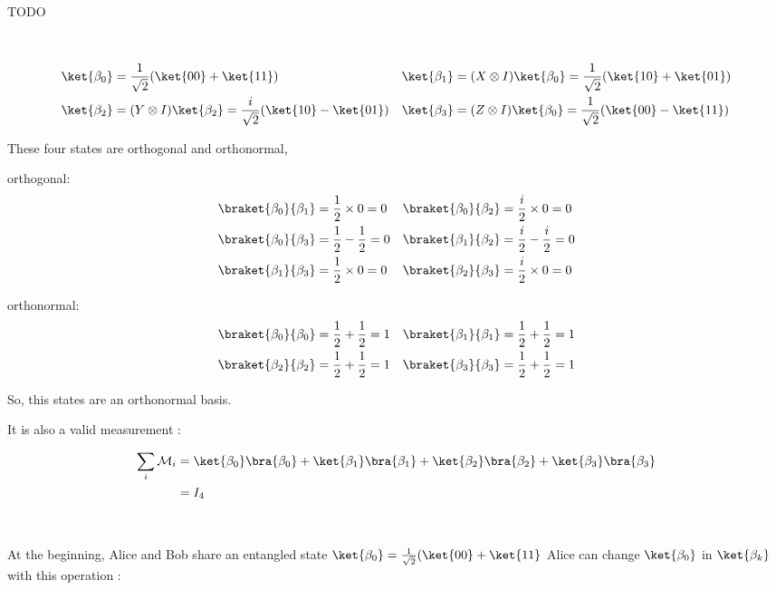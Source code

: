 ~

TODO

~

\begin{align*}
  \ket{\beta_0} &= \frac{1}{\sqrt 2}(\ket{00} + \ket{11})
  &\ket{\beta_1} &= (X \otimes I)\ket{\beta_0} =
    \frac{1}{\sqrt 2}(\ket{10}+\ket{01}) \\
  \ket{\beta_2} &= (Y \otimes I)\ket{\beta_2} =
    \frac{i}{\sqrt 2}(\ket{10} - \ket{01})
  &\ket{\beta_3} &= (Z \otimes I)\ket{\beta_0} =
    \frac{1}{\sqrt 2}(\ket{00}-\ket{11})
\end{align*}

These four states are orthogonal and orthonormal,

orthogonal:
\begin{align*}
  \braket{\beta_0}{\beta_1} &= \frac 1 2 \times 0 = 0 &
  \braket{\beta_0}{\beta_2} &= \frac i 2 \times 0 = 0 \\
  \braket{\beta_0}{\beta_3} &= \frac 1 2 - \frac 1 2 = 0 &
  \braket{\beta_1}{\beta_2} &= \frac i 2 - \frac i 2 = 0 \\
  \braket{\beta_1}{\beta_3} &= \frac 1 2 \times 0 = 0 &
  \braket{\beta_2}{\beta_3} &= \frac i 2 \times 0 = 0
\end{align*}

orthonormal:
\begin{align*}
  \braket{\beta_0}{\beta_0} &= \frac 1 2 + \frac 1 2 = 1 &
  \braket{\beta_1}{\beta_1} &= \frac 1 2 + \frac 1 2 = 1 \\
  \braket{\beta_2}{\beta_2} &= \frac 1 2 + \frac 1 2 = 1 &
  \braket{\beta_3}{\beta_3} &= \frac 1 2 + \frac 1 2 = 1 \\
\end{align*}

So, this states are an orthonormal basis.

It is also a valid measurement :

\begin{align*}
  \sum_i \mathcal M _i &=
  \ket {\beta_0} \bra {\beta_0} + \ket {\beta_1} \bra {\beta_1} +
  \ket {\beta_2} \bra {\beta_2} + \ket {\beta_3} \bra {\beta_3} \\
  &= I_4
\end{align*}

~

At the beginning, Alice and Bob share an entangled state $\ket{\beta_0} = \frac
1 {\sqrt 2}(\ket{00} + \ket{11}$ Alice can change $\ket{\beta_0}$ in $\ket
{\beta_k}$ with this operation :


